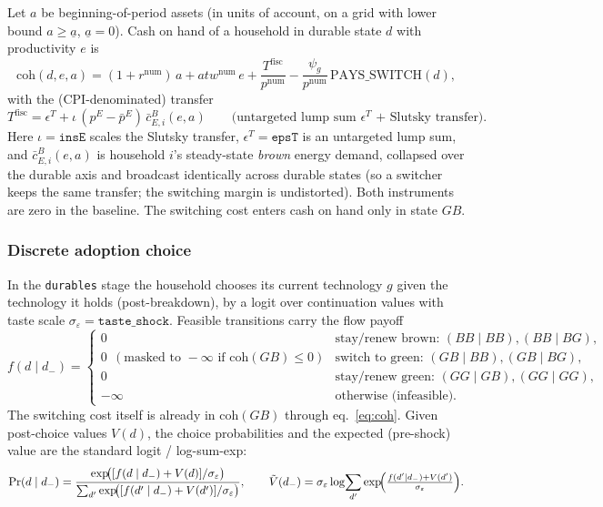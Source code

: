 \documentclass[11pt,a4paper]{article}
\newcommand{\num}{\mathrm{num}}
\newcommand{\pE}{p^{E}}
\newcommand{\coh}{\mathrm{coh}}
\begin{document}
Let $a$ be beginning-of-period assets (in units of account, on a grid with lower
bound $a\ge \underline a$, $\underline a=0$). Cash on hand of a household in
durable state $d$ with productivity $e$ is
\begin{equation}
\coh(d,e,a)=(1+r^{\num})\,a+atw^{\num}\,e
+\frac{T^{\text{fisc}}}{p^{\num}}
-\frac{\psi_g}{p^{\num}}\,\mathrm{PAYS\_SWITCH}(d),
\label{eq:coh}
\end{equation}
with the (CPI-denominated) transfer
\begin{equation}
T^{\text{fisc}} = \epsilon^{T}+\iota\,(\pE-\bar\pE)\,\bar c^{B}_{E,i}(e,a)
\qquad\text{(untargeted lump sum $\epsilon^{T}$ + Slutsky transfer).}
\end{equation}
Here $\iota=\texttt{insE}$ scales the Slutsky transfer, $\epsilon^{T}=\texttt{epsT}$
is an untargeted lump sum, and $\bar c^{B}_{E,i}(e,a)$ is household $i$'s
steady-state \emph{brown} energy demand, collapsed over the durable axis and
broadcast identically across durable states (so a switcher keeps the same
transfer; the switching margin is undistorted). Both instruments are zero in the
baseline. The switching cost enters cash on hand only in state $GB$.

\subsubsection{Discrete adoption choice}\label{sec:logit}

In the \texttt{durables} stage the household chooses its current technology $g$
given the technology it holds (post-breakdown), by a logit over continuation
values with taste scale $\sigma_\varepsilon=\texttt{taste\_shock}$. Feasible
transitions carry the flow payoff
\begin{equation}
f(d\mid d_-)=
\begin{cases}
0 & \text{stay/renew brown: } (BB\mid BB),(BB\mid BG),\\
0\ \ (\text{masked to }-\infty\text{ if }\coh(GB)\le 0)
& \text{switch to green: } (GB\mid BB),(GB\mid BG),\\
0 & \text{stay/renew green: } (GG\mid GB),(GG\mid GG),\\
-\infty & \text{otherwise (infeasible).}
\end{cases}
\end{equation}
The switching cost itself is already in $\coh(GB)$ through
eq.~\eqref{eq:coh}. Given post-choice values $V(d)$, the choice probabilities and the expected (pre-shock) value are
the standard logit / log-sum-exp:
\begin{equation}
\Pr(d\mid d_-)=\frac{\exp\!\bigl([f(d\mid d_-)+V(d)]/\sigma_\varepsilon\bigr)}
{\sum_{d'}\exp\!\bigl([f(d'\mid d_-)+V(d')]/\sigma_\varepsilon\bigr)},
\qquad
\tilde V(d_-)=\sigma_\varepsilon\log\!\sum_{d'}\exp\!\Bigl(\tfrac{f(d'\mid d_-)+V(d')}{\sigma_\varepsilon}\Bigr).
\end{equation}
\end{document}
